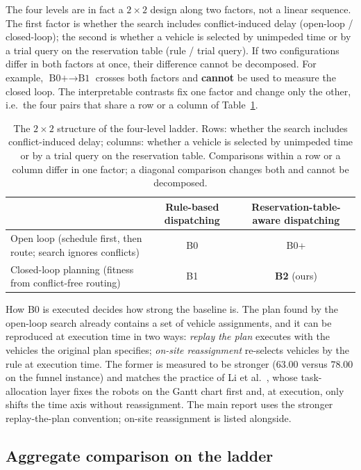 \documentclass[manuscript,screen,review]{acmart}
\begin{document}
The four levels are in fact a $2\times2$ design along two factors, not a linear sequence. The first factor is whether the search includes conflict-induced delay (open-loop / closed-loop); the second is whether a vehicle is selected by unimpeded time or by a trial query on the reservation table (rule / trial query).
If two configurations differ in both factors at once, their difference cannot be decomposed.
For example, $\text{B0+}\to\text{B1}$ crosses both factors and \textbf{cannot} be used to measure the closed loop.
The interpretable contrasts fix one factor and change only the other, i.e.\ the four pairs that share a row or a column of Table~\ref{tab:arms}.

\begin{table}[t]
\caption{The $2\times2$ structure of the four-level ladder. Rows: whether the search includes conflict-induced delay; columns: whether a vehicle is selected by unimpeded time or by a trial query on the reservation table.
Comparisons within a row or a column differ in one factor; a diagonal comparison changes both and cannot be decomposed.}
\label{tab:arms}
\footnotesize
\begin{tabular}{@{}lcc@{}}
\toprule
 & Rule-based dispatching & Reservation-table-aware dispatching \\
\midrule
Open loop (schedule first, then route; search ignores conflicts) & B0 & B0+ \\
Closed-loop planning (fitness from conflict-free routing) & B1 & \textbf{B2} (ours) \\
\bottomrule
\end{tabular}
\end{table}

How B0 is executed decides how strong the baseline is. The plan found by the open-loop search already contains a set of vehicle assignments, and it can be reproduced at execution time in two ways:
\emph{replay the plan} executes with the vehicles the original plan specifies; \emph{on-site reassignment} re-selects vehicles by the rule at execution time.
The former is measured to be stronger ($63.00$ versus $78.00$ on the funnel instance) and matches the practice of Li et al.~\cite{li2026framework}, whose task-allocation layer fixes the robots on the Gantt chart first and, at execution, only shifts the time axis without reassignment.
The main report uses the stronger replay-the-plan convention; on-site reassignment is listed alongside.

\subsection{Aggregate comparison on the ladder}
\label{sec:main}
\end{document}

